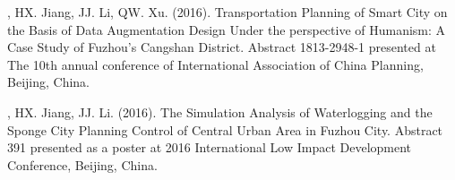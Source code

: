 \begin{etaremune}
\item
    \Shaoqing, HX. Jiang, JJ. Li, QW. Xu. (2016).
    Transportation Planning of Smart City on the Basis of Data Augmentation Design Under the perspective of Humanism: A Case Study of Fuzhou’s Cangshan District.
    Abstract 1813-2948-1 presented at The 10th annual conference of International Association of China Planning, Beijing, China.
\item
    \Shaoqing, HX. Jiang, JJ. Li. (2016).
    The Simulation Analysis of Waterlogging and the Sponge City Planning Control of Central Urban Area in Fuzhou City.
    Abstract 391 presented as a poster at 2016 International Low Impact Development Conference, Beijing, China.
\end{etaremune}
